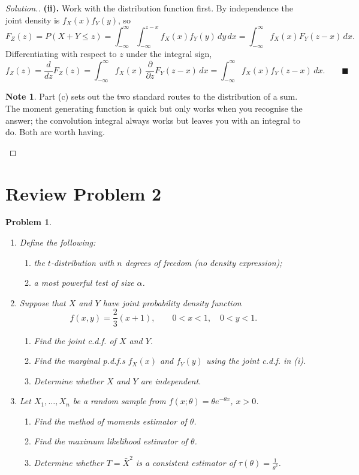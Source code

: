 \documentclass[12pt,a4paper]{report}
\theoremstyle{definition}
\newtheorem{note}[thm]{Note}
\theoremstyle{plain}
\newtheorem{problemx}{Problem}[section]
\newenvironment{problem}{\begin{problemx}}{\end{problemx}}
\newenvironment{solution}
  {\renewcommand{\qedsymbol}{}\begin{proof}[\textit{Solution}.]}
  {\end{proof}}
\begin{document}
\begin{solution}
\textbf{(ii).} Work with the distribution function first. By independence the
joint density is $f_X(x)f_Y(y)$, so
\[F_Z(z)=P(X+Y\leq z)
=\int_{-\infty}^{\infty}\int_{-\infty}^{z-x}f_X(x)f_Y(y)\,dy\,dx
=\int_{-\infty}^{\infty}f_X(x)F_Y(z-x)\,dx.\]
Differentiating with respect to $z$ under the integral sign,
\[f_Z(z)=\frac{d}{dz}F_Z(z)
=\int_{-\infty}^{\infty}f_X(x)\,\frac{\partial}{\partial z}F_Y(z-x)\,dx
=\int_{-\infty}^{\infty}f_X(x)f_Y(z-x)\,dx.\qquad\blacksquare\]

\begin{note}
Part (c) sets out the two standard routes to the distribution of a sum. The
moment generating function is quick but only works when you recognise the answer;
the convolution integral always works but leaves you with an integral to do. Both
are worth having.
\end{note}
\end{solution}

\section{Review Problem 2}

\begin{problem}
\begin{enumerate}
\item[(a).] Define the following:
  \begin{enumerate}
  \item[(i).] the $t$-distribution with $n$ degrees of freedom (no density
  expression);
  \item[(ii).] a most powerful test of size $\alpha$.
  \end{enumerate}
\item[(b).] Suppose that $X$ and $Y$ have joint probability density function
\[f(x,y)=\frac{2}{3}(x+1),\qquad 0<x<1,\quad 0<y<1.\]
  \begin{enumerate}
  \item[(i).] Find the joint c.d.f. of $X$ and $Y$.
  \item[(ii).] Find the marginal p.d.f.s $f_X(x)$ and $f_Y(y)$ using the joint
  c.d.f. in (i).
  \item[(iii).] Determine whether $X$ and $Y$ are independent.
  \end{enumerate}
\item[(c).] Let $X_1,\ldots,X_n$ be a random sample from
$f(x;\theta)=\theta e^{-\theta x}$, $x>0$.
  \begin{enumerate}
  \item[(i).] Find the method of moments estimator of $\theta$.
  \item[(ii).] Find the maximum likelihood estimator of $\theta$.
  \item[(iii).] Determine whether $T=\bar X^2$ is a consistent estimator of
  $\tau(\theta)=\frac{1}{\theta^2}$.
  \end{enumerate}
\end{enumerate}
\end{problem}
\end{document}
